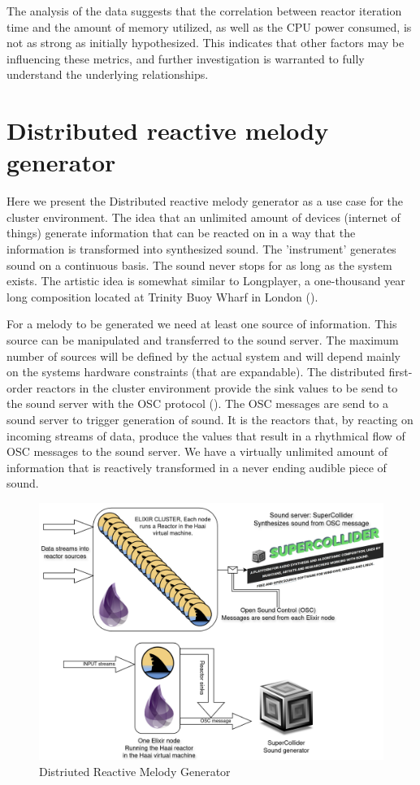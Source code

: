 \documentclass[a4paper]{book}
\begin{document}
The analysis of the data suggests that the correlation between reactor iteration time and the amount of memory utilized, as well as the CPU power consumed, is not as strong as initially hypothesized. This indicates that other factors may be influencing these metrics, and further investigation is warranted to fully understand the underlying relationships.

\newpage

\section{Distributed reactive melody generator} \label{sec:drmg}
Here we present the Distributed reactive melody generator as a use case for the cluster environment. The idea that an unlimited amount of devices (internet of things) generate information that can be reacted on in a way that the information is transformed into synthesized sound. The 'instrument' generates sound on a continuous basis. The sound never stops for as long as the system exists. The artistic idea is somewhat similar to Longplayer, a one-thousand year long composition located at Trinity Buoy Wharf in London (\cite{Longplayer2024}). 
	
For a melody to be generated we need at least one source of information. This source can be manipulated and transferred to the sound server. The maximum number of sources will be defined by the actual system and will depend mainly on the systems hardware constraints (that are expandable). The distributed first-order reactors in the cluster environment provide the sink values to be send to the sound server with the OSC protocol (\cite{schmeder2010best}). The OSC messages are send to a sound server to trigger generation of sound. It is the reactors that, by reacting on incoming streams of data, produce the values that result in a rhythmical flow of OSC messages to the sound server. We have a virtually unlimited amount of information that is reactively transformed in a never ending audible piece of sound.

\begin{figure}[h]
	\includegraphics[width=\textwidth]{drmg200.drawio}
	\caption{Distriuted Reactive Melody Generator}
	\label{fig:drmg}
\end{figure}
 
\end{document}
